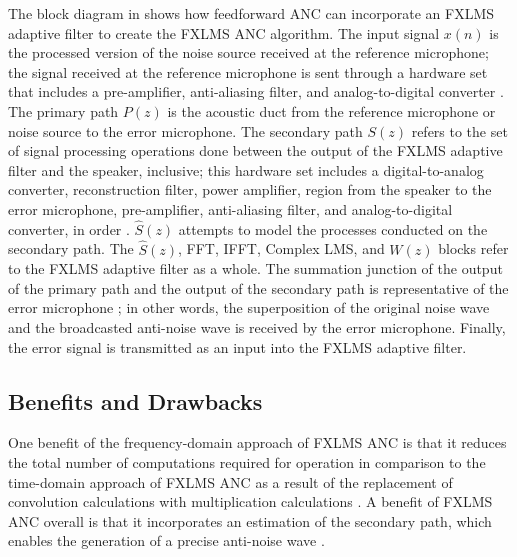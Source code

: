 \documentclass[11pt]{article}
\begin{document}
The block diagram in  shows how feedforward ANC can incorporate an FXLMS adaptive filter to create the FXLMS ANC algorithm. The input signal $x(n)$ is the processed version of the noise source received at the reference microphone; the signal received at the reference microphone is sent through a hardware set that includes a pre-amplifier, anti-aliasing filter, and analog-to-digital converter \cite{kajikawa}. The primary path $P(z)$ is the acoustic duct from the reference microphone or noise source to the error microphone. The secondary path $S(z)$ refers to the set of signal processing operations done between the output of the FXLMS adaptive filter and the speaker, inclusive; this hardware set includes a digital-to-analog converter, reconstruction filter, power amplifier, region from the speaker to the error microphone, pre-amplifier, anti-aliasing filter, and analog-to-digital converter, in order \cite{kajikawa}. $\hat{S}(z)$ attempts to model the processes conducted on the secondary path. The $\hat{S}(z)$, FFT, IFFT, Complex LMS, and $W(z)$ blocks refer to the FXLMS adaptive filter as a whole. The summation junction of the output of the primary path and the output of the secondary path is representative of the error microphone \cite{kuo}; in other words, the superposition of the original noise wave and the broadcasted anti-noise wave is received by the error microphone. Finally, the error signal is transmitted as an input into the FXLMS adaptive filter.


\subsection{Benefits and Drawbacks}

One benefit of the frequency-domain approach of FXLMS ANC is that it reduces the total number of computations required for operation in comparison to the time-domain approach of FXLMS ANC as a result of the replacement of convolution calculations with multiplication calculations \cite{kuo}. A benefit of FXLMS ANC overall is that it incorporates an estimation of the secondary path, which enables the generation of a precise anti-noise wave \cite{gaur}.
\end{document}

